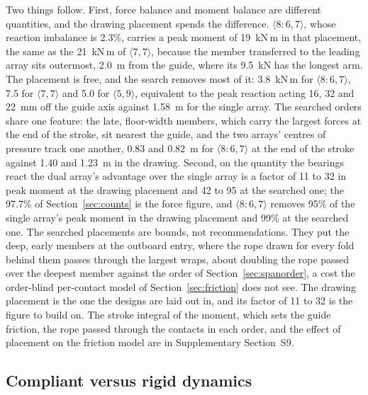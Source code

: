 \documentclass[preprint,12pt,number]{elsarticle}
\newcommand{\cfg}[2]{\langle #1,#2\rangle}
\begin{document}
Two things follow. First, force balance and moment balance are different quantities, and the drawing placement spends the difference. $\cfg{8{:}6}{7}$, whose reaction imbalance is 2.3\%, carries a peak moment of 19~kN\,m in that placement, the same as the 21~kN\,m of $\cfg{7}{7}$, because the member transferred to the leading array sits outermost, 2.0~m from the guide, where its 9.5~kN has the longest arm. The placement is free, and the search removes most of it: 3.8~kN\,m for $\cfg{8{:}6}{7}$, 7.5 for $\cfg{7}{7}$ and 5.0 for $\cfg{5}{9}$, equivalent to the peak reaction acting 16, 32 and 22~mm off the guide axis against 1.58~m for the single array. The searched orders share one feature: the late, floor-width members, which carry the largest forces at the end of the stroke, sit nearest the guide, and the two arrays' centres of pressure track one another, 0.83 and 0.82~m for $\cfg{8{:}6}{7}$ at the end of the stroke against 1.40 and 1.23~m in the drawing. Second, on the quantity the bearings react the dual array's advantage over the single array is a factor of 11 to 32 in peak moment at the drawing placement and 42 to 95 at the searched one; the 97.7\% of Section~\ref{sec:counts} is the force figure, and $\cfg{8{:}6}{7}$ removes 95\% of the single array's peak moment in the drawing placement and 99\% at the searched one. The searched placements are bounds, not recommendations. They put the deep, early members at the outboard entry, where the rope drawn for every fold behind them passes through the largest wraps, about doubling the rope passed over the deepest member against the order of Section~\ref{sec:spanorder}, a cost the order-blind per-contact model of Section~\ref{sec:friction} does not see. The drawing placement is the one the designs are laid out in, and its factor of 11 to 32 is the figure to build on. The stroke integral of the moment, which sets the guide friction, the rope passed through the contacts in each order, and the effect of placement on the friction model are in Supplementary Section~S9.

\subsection{Compliant versus rigid dynamics}
\label{sec:dyn}
\end{document}
